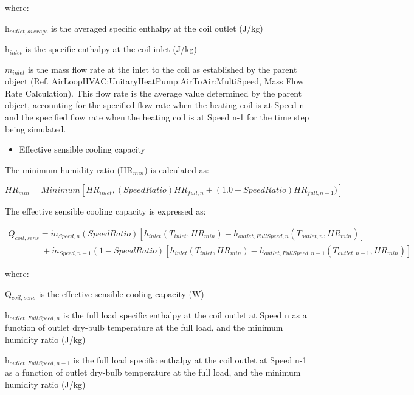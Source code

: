 where:

h\(_{outlet,average}\) is the averaged specific enthalpy at the coil outlet (J/kg)

h\(_{inlet}\) is the specific enthalpy at the coil inlet (J/kg)

\({\dot{m}_{inlet}}\) is the mass flow rate at the inlet to the coil as established by the parent object (Ref. AirLoopHVAC:UnitaryHeatPump:AirToAir:MultiSpeed, Mass Flow Rate Calculation). This flow rate is the average value determined by the parent object, accounting for the specified flow rate when the heating coil is at Speed n and the specified flow rate when the heating coil is at Speed n-1 for the time step being simulated.

\begin{itemize}
  \item Effective sensible cooling capacity
\end{itemize}

The minimum humidity ratio (HR\(_{min}\)) is calculated as:

\begin{equation}
HR_{min} = Minimum[HR_{inlet}, (SpeedRatio)HR_{full,n}+(1.0-SpeedRatio)HR_{full,n-1})]
\end{equation}

The effective sensible cooling capacity is expressed as:

\begin{equation}
\begin{array}{l}
{Q_{coil,sens}} = {\dot{m}_{Speed,n}}(SpeedRatio)[{h_{inlet}}({T_{inlet}},H{R_{min}}) - {h_{outlet,FullSpeed,n}}({T_{outlet,n}},H{R_{min}})] \\
\;\;\;\;\;\;\;\;\;\;\;\;\;\; + {\dot{m}_{Speed,n-1}}(1 - SpeedRatio)[{h_{inlet}}({T_{inlet}},H{R_{min}}) - {h_{outlet,FullSpeed,n-1}}({T_{outlet,n-1}},H{R_{min}})]
\end{array}
\end{equation}

where:

Q\(_{coil,sens}\) is the effective sensible cooling capacity (W)

h\(_{outlet,FullSpeed,n}\) is the full load specific enthalpy at the coil outlet at Speed n as a function of outlet dry-bulb temperature at the full load, and the minimum humidity ratio (J/kg)

h\(_{outlet,FullSpeed,n-1}\) is the full load specific enthalpy at the coil outlet at Speed n-1 as a function of outlet dry-bulb temperature at the full load, and the minimum humidity ratio (J/kg)

